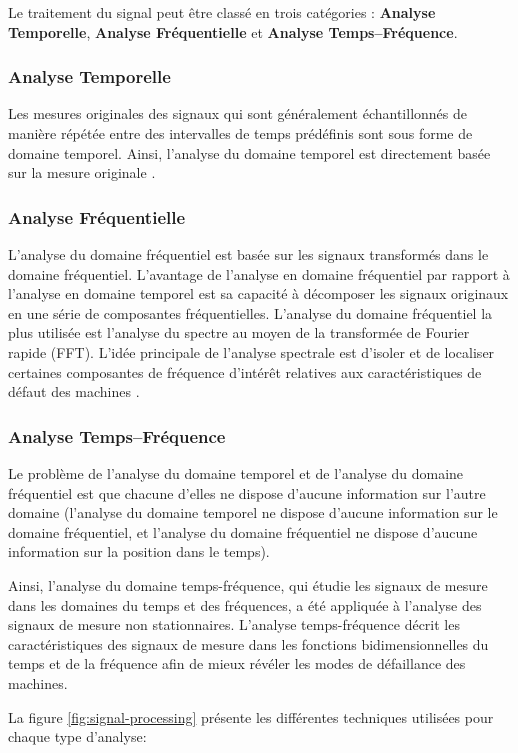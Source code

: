 Le traitement du signal peut être classé en trois catégories : \textbf{Analyse Temporelle}, \textbf{Analyse Fréquentielle} et \textbf{Analyse Temps–Fréquence}.

\subsubsection{Analyse Temporelle}
Les mesures originales des signaux qui sont généralement échantillonnés de manière répétée entre des intervalles de temps prédéfinis sont sous forme de domaine temporel. Ainsi, l'analyse du domaine temporel est directement basée sur la mesure originale \cite{Lei2016}.


\subsubsection{Analyse Fréquentielle}
L'analyse du domaine fréquentiel est basée sur les signaux transformés dans le domaine fréquentiel. L'avantage de l'analyse en domaine fréquentiel par rapport à l'analyse en domaine temporel est sa capacité à décomposer les signaux originaux en une série de composantes fréquentielles. L'analyse du domaine fréquentiel la plus utilisée est l'analyse du spectre au moyen de la transformée de Fourier rapide (FFT). L'idée principale de l'analyse spectrale est d'isoler et de localiser certaines composantes de fréquence d'intérêt relatives aux caractéristiques de défaut des machines \cite{Lei2016a}.


\subsubsection{Analyse Temps–Fréquence}
Le problème de l'analyse du domaine temporel et de l'analyse du domaine fréquentiel est que chacune d'elles ne dispose d'aucune information sur l'autre domaine (l'analyse du domaine temporel ne dispose d'aucune information sur le domaine fréquentiel, et l'analyse du domaine fréquentiel ne dispose d'aucune information sur la position dans le temps).

Ainsi, l'analyse du domaine temps-fréquence, qui
étudie les signaux de mesure dans les domaines du temps et des fréquences, a été appliquée à l'analyse des signaux de mesure non stationnaires. L'analyse temps-fréquence décrit les caractéristiques des signaux de mesure dans les fonctions bidimensionnelles du temps et de la fréquence afin de mieux révéler les modes de défaillance des machines.


La figure \ref{fig:signal-processing} présente les différentes techniques utilisées pour chaque type d'analyse:

